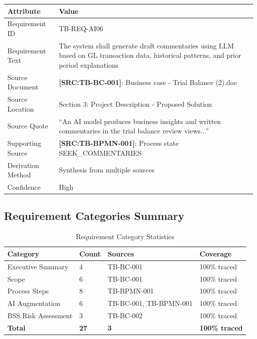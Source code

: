 \documentclass[11pt,a4paper]{article}
\newcommand{\srcref}[1]{\textcolor{sourcegreen}{\textbf{[SRC:#1]}}}
\begin{document}
\begin{table}[h]
\centering
\begin{tabular}{@{}L{3.5cm}L{10.5cm}@{}}
\toprule
\textbf{Attribute} & \textbf{Value} \\
\midrule
Requirement ID & TB-REQ-AI06 \\
Requirement Text & The system shall generate draft commentaries using LLM based on GL transaction data, historical patterns, and prior period explanations \\
Source Document & \srcref{TB-BC-001}: Business case - Trial Balance (2).doc \\
Source Location & Section 3: Project Description - Proposed Solution \\
Source Quote & ``An AI model produces business insights and written commentaries in the trial balance review views...'' \\
Supporting Source & \srcref{TB-BPMN-001}: Process state SEEK\_COMMENTARIES \\
Derivation Method & Synthesis from multiple sources \\
Confidence & High \\
\bottomrule
\end{tabular}
\end{table}

\subsection{Requirement Categories Summary}

\begin{table}[h]
\centering
\caption{Requirement Category Statistics}
\begin{tabular}{@{}L{5cm}C{2.5cm}C{2.5cm}C{3cm}@{}}
\toprule
\textbf{Category} & \textbf{Count} & \textbf{Sources} & \textbf{Coverage} \\
\midrule
Executive Summary & 4 & TB-BC-001 & 100\% traced \\
Scope & 6 & TB-BC-001 & 100\% traced \\
Process Steps & 8 & TB-BPMN-001 & 100\% traced \\
AI Augmentation & 6 & TB-BC-001, TB-BPMN-001 & 100\% traced \\
BSS Risk Assessment & 3 & TB-BC-002 & 100\% traced \\
\midrule
\textbf{Total} & \textbf{27} & \textbf{3} & \textbf{100\% traced} \\
\bottomrule
\end{tabular}
\end{table}
\end{document}
